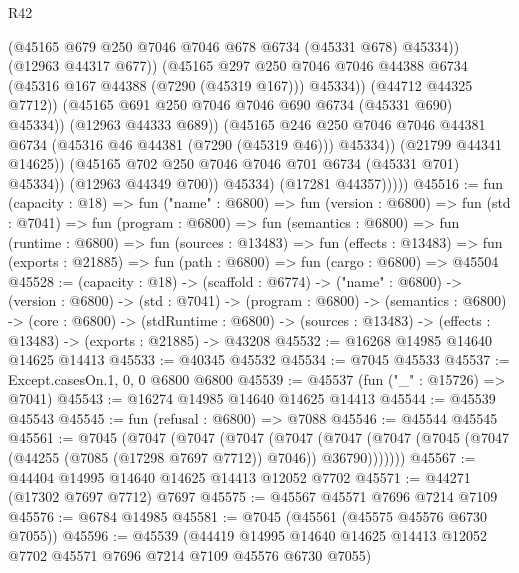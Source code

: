 \begin{lexlean}{R42}
\begin{coremodule}
{                                  (@45165 @679 @250 @7046 @7046 @678 @6734 (@45331 @678) @45334))
                                (@12963 @44317 @677))
                              (@45165
                                @297
                                @250
                                @7046
                                @7046
                                @44388
                                @6734
                                (@45316 @167 @44388 (@7290 (@45319 @167)))
                                @45334))
                            (@44712 @44325 @7712))
                          (@45165 @691 @250 @7046 @7046 @690 @6734 (@45331 @690) @45334))
                        (@12963 @44333 @689))
                      (@45165
                        @246
                        @250
                        @7046
                        @7046
                        @44381
                        @6734
                        (@45316 @46 @44381 (@7290 (@45319 @46)))
                        @45334))
                    (@21799 @44341 @14625))
                  (@45165 @702 @250 @7046 @7046 @701 @6734 (@45331 @701) @45334))
                (@12963 @44349 @700))
              @45334)
            (@17281 @44357)))))
@45516 := fun (capacity : @18) =>
  fun ("name" : @6800) =>
  fun (version : @6800) =>
  fun (std : @7041) =>
  fun (program : @6800) =>
  fun (semantics : @6800) =>
  fun (runtime : @6800) =>
  fun (sources : @13483) =>
  fun (effects : @13483) =>
  fun (exports : @21885) => fun (path : @6800) => fun (cargo : @6800) => @45504
@45528 := (capacity : @18) ->
  (scaffold : @6774) ->
  ("name" : @6800) ->
  (version : @6800) ->
  (std : @7041) ->
  (program : @6800) ->
  (semantics : @6800) ->
  (core : @6800) ->
  (stdRuntime : @6800) -> (sources : @13483) -> (effects : @13483) -> (exports : @21885) -> @43208
@45532 := @16268 @14985 @14640 @14625 @14413
@45533 := @40345 @45532
@45534 := @7045 @45533
@45537 := Except.casesOn.{1, 0, 0} @6800 @6800
@45539 := @45537 (fun ("_" : @15726) => @7041)
@45543 := @16274 @14985 @14640 @14625 @14413
@45544 := @45539 @45543
@45545 := fun (refusal : @6800) => @7088
@45546 := @45544 @45545
@45561 := @7045
    (@7047
      (@7047
        (@7047
          (@7047
            (@7047 (@7047 (@7045 (@7047 (@44255 (@7085 (@17298 @7697 @7712)) @7046)) @36790)))))))
@45567 := @44404 @14995 @14640 @14625 @14413 @12052 @7702
@45571 := @44271 (@17302 @7697 @7712) @7697
@45575 := @45567 @45571 @7696 @7214 @7109
@45576 := @6784 @14985
@45581 := @7045 (@45561 (@45575 @45576 @6730 @7055))
@45596 := @45539
    (@44419 @14995 @14640 @14625 @14413 @12052 @7702 @45571 @7696 @7214 @7109 @45576 @6730 @7055)
}
\end{coremodule}
\end{lexlean}
